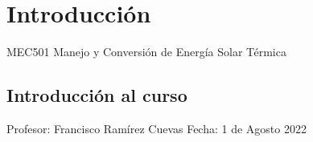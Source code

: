 \documentclass[letterpaper,10pt,english]{jupyterBook}
\begin{document}
\sphinxstepscope


\part{Introducción}

\sphinxstepscope

\sphinxAtStartPar
MEC501 \sphinxhyphen{} Manejo y Conversión de Energía Solar Térmica


\chapter{Introducción al curso}
\label{\detokenize{0_introduccion/0_introduccion:introduccion-al-curso}}\label{\detokenize{0_introduccion/0_introduccion::doc}}
\sphinxAtStartPar

Profesor: Francisco Ramírez Cuevas
Fecha: 1 de Agosto 2022
\end{document}
